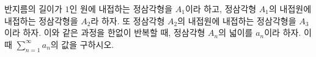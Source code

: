 반지름의 길이가 $1$인 원에 내접하는 정삼각형을 $A_1$이라 하고, 정삼각형 $A_1$의 내접원에 내접하는 정삼각형을 $A_2$라 하자. 또 정삼각형 $A_2$의 내접원에 내접하는 정삼각형을 $A_3$이라 하자. 이와 같은 과정을 한없이 반복할 때, 정삼각형 $A_n$의 넓이를 $a_n$이라 하자. 이때 $\displaystyle\sum_{n=1}^{\infty}a_n$의 값을 구하시오.
